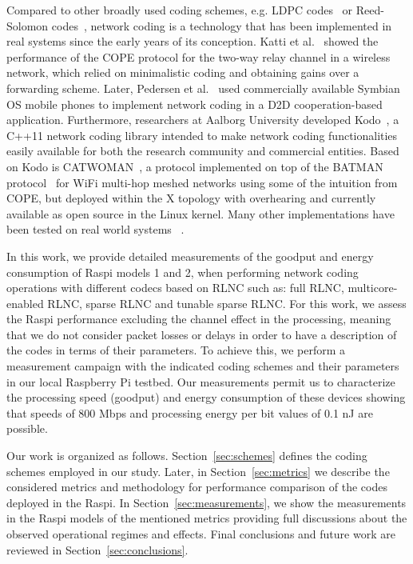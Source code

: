 Compared to other broadly used coding schemes, e.g. \ac{LDPC}
codes~\cite{gallager1962low} or Reed-Solomon
codes~\cite{reed1960polynomial}, network coding is a technology that
has been implemented in real systems since the early years of its
conception. Katti et al.~\cite{katti2008xors} showed the
performance of the COPE protocol for the two-way relay channel
in a wireless network, which relied on minimalistic coding and obtaining
gains over a forwarding scheme. Later, Pedersen et
al.~\cite{pedersen2008implementation} used commercially available
Symbian OS mobile phones to implement network coding in a
\ac{D2D} cooperation-based application. Furthermore, researchers at Aalborg
University developed Kodo~\cite{kodo2011pedersen}, a C++11 network
coding library intended to make network coding functionalities easily
available for both the research community and commercial entities.
Based on Kodo is CATWOMAN~\cite{hundeboll2012catwoman}, a protocol
implemented on top of the BATMAN protocol~\cite{johnson2008simple} for
WiFi multi-hop meshed networks using some of the intuition from
COPE, but deployed within the X topology with overhearing and
currently available as open source in the Linux kernel. Many other
implementations have been tested on real world systems~
\cite{pahlevani2013playncool,katti2008xors,krigslund2013core,paramanathan2013leanandmean}.

In this work, we provide detailed measurements of the goodput and energy
consumption of \ac{Raspi} models 1 and 2, when performing network coding
operations with different codecs based on \ac{RLNC} \cite{ho2006random}
such as: full \ac{RLNC}, multicore-enabled \ac{RLNC}, sparse \ac{RLNC}
and tunable sparse \ac{RLNC}. For this work, we assess the \ac{Raspi}
performance excluding the channel effect in the processing, meaning that
we do not consider packet losses or delays in order to have a
description of the codes in terms of their parameters. To achieve this,
we perform a measurement campaign with the indicated coding schemes and
their parameters in our local Raspberry Pi testbed. Our measurements permit
us to characterize the processing speed (goodput) and energy consumption
of these devices showing that speeds of 800 Mbps and processing energy per bit
values of 0.1 nJ are possible.

Our work is organized as follows. Section~\ref{sec:schemes} defines the
coding schemes employed in our study. Later, in Section~\ref{sec:metrics}
we describe the considered metrics and methodology for performance comparison
of the codes deployed in the \ac{Raspi}. In Section~\ref{sec:measurements}, we
show the measurements in the \ac{Raspi} models of the mentioned metrics
providing full discussions about the observed operational regimes and effects.
Final conclusions and future work are reviewed in
Section~\ref{sec:conclusions}.

